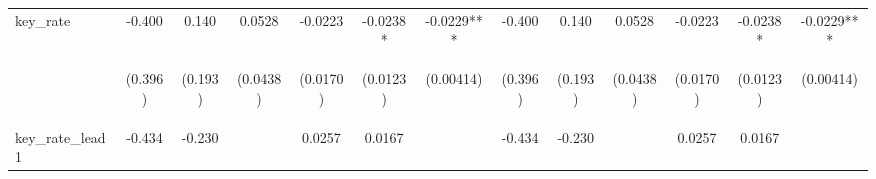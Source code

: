 \documentclass[]{article}
\begin{document}
\begin{center}
\begin{tabular}{lcccccccccccc}
key\_rate & -0.400 & 0.140 & 0.0528 & -0.0223 & -0.0238* & -0.0229*** & -0.400 & 0.140 & 0.0528 & -0.0223 & -0.0238* & -0.0229*** \\
\vspace{4pt} & \begin{footnotesize}(0.396)\end{footnotesize} & \begin{footnotesize}(0.193)\end{footnotesize} & \begin{footnotesize}(0.0438)\end{footnotesize} & \begin{footnotesize}(0.0170)\end{footnotesize} & \begin{footnotesize}(0.0123)\end{footnotesize} & \begin{footnotesize}(0.00414)\end{footnotesize} & \begin{footnotesize}(0.396)\end{footnotesize} & \begin{footnotesize}(0.193)\end{footnotesize} & \begin{footnotesize}(0.0438)\end{footnotesize} & \begin{footnotesize}(0.0170)\end{footnotesize} & \begin{footnotesize}(0.0123)\end{footnotesize} & \begin{footnotesize}(0.00414)\end{footnotesize} \\
key\_rate\_lead1 & -0.434 & -0.230 &  & 0.0257 & 0.0167 &  & -0.434 & -0.230 &  & 0.0257 & 0.0167 &  \\

\end{tabular}
\end{center}
\end{document}
